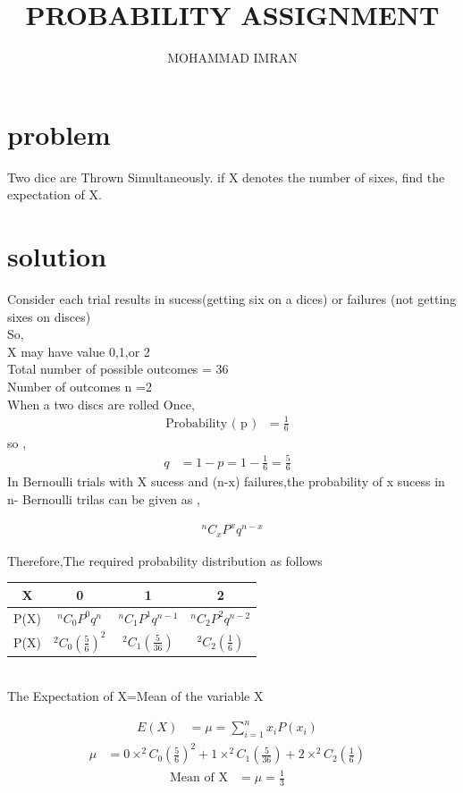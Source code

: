 \documentclass[journal,12pt,two column]{article}
\title{PROBABILITY ASSIGNMENT}
\author{MOHAMMAD IMRAN}
\begin{document}
\maketitle
\bigskip


 \section{problem }
  Two dice are Thrown Simultaneously. if X denotes the number of sixes, find the
expectation of X.

\section{solution }
Consider each trial results in sucess(getting six on a dices) or failures (not getting sixes on disces)\\
So,\\
X may have value 0,1,or 2\\
Total number of possible outcomes = 36\\
Number of outcomes n =2\\
When a  two discs are rolled Once,\\


\begin{align}
\text{Probability ( p )} &=
\frac{1}{6}&
 \end{align}
 so ,
 \begin{align}
  q &= 1-p = 1-\frac{1}{6} = \frac{5}{6}&
 \end{align}
 In Bernoulli trials with X sucess and (n-x) failures,the probability of x sucess in n- Bernoulli trilas can be given as ,
 
\begin{align}
 &^nC_xP^xq^{n-x}&
\end{align}

Therefore,The required probability distribution as follows\\

 \begin{tabular}{ |c |c |c |c |}
 \hline
 X  &  0  &  1  &  2\\
 \hline
 
 P(X)  &  $^nC_0P^0q^n$  &  $^nC_1P^1q^{n-1}$  &  $^nC_2P^2q^{n-2}$\\
 \hline
 
 P(X)  &   $^2C_0(\frac{5}{6})^2$ &  $^2C_1(\frac{5}{36})$ &   $^2C_2(\frac{1}{6})$ \\
 \hline
 
 \end{tabular}\\
 
 
 The Expectation of X=Mean of the variable X 
 
 \begin{align}
  E(X)&=\mu=\sum_{i=1}^{n} x_i P(x_i)&
\end{align}
\begin{align}
\mu&=0\times^2C_0(\frac{5}{6})^2+1\times^2C_1(\frac{5}{36})+2\times^2C_2(\frac{1}{6})&
\end{align}
\begin{align}
 \text{Mean of X}&=\mu=\frac{1}{3}&
 \end{align}
 
\end{document}
